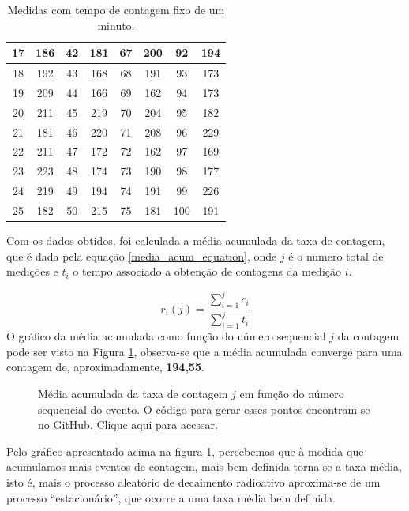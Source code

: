 \documentclass{article}
\begin{document}
\begin{table}[ht]
\begin{tabular}{|c|c|c|c|c|c|c|c|}
17 & 186 & 42 & 181 & 67 & 200 & 92 & 194 \\ \hline
18 & 192 & 43 & 168 & 68 & 191 & 93 & 173 \\ \hline
19 & 209 & 44 & 166 & 69 & 162 & 94 & 173 \\ \hline
20 & 211 & 45 & 219 & 70 & 204 & 95 & 182 \\ \hline
21 & 181 & 46 & 220 & 71 & 208 & 96 & 229 \\ \hline
22 & 211 & 47 & 172 & 72 & 162 & 97 & 169 \\ \hline
23 & 223 & 48 & 174 & 73 & 190 & 98 & 177 \\ \hline
24 & 219 & 49 & 194 & 74 & 191 & 99 & 226 \\ \hline
25 & 182 & 50 & 215 & 75 & 181 & 100 & 191 \\ \hline
    \end{tabular}
\caption{Medidas com tempo de contagem fixo de um minuto.}
    \label{tabela_1}
\end{table}

Com os dados obtidos, foi calculada a média acumulada \cite{fisicaexpV} da taxa de contagem, que é dada pela equação \ref{media_acum_equation}, onde $j$ é o numero total de medições e $t _i$ o tempo associado a obtenção de contagens da medição $i$.

\begin{equation}
\label{media_acum_equation}
r_i (j) = \frac{\sum _{i=1} ^{j} c_i}{\sum _{i=1} ^{j} t_i}
\end{equation}
O gráfico da média acumulada como função do número sequencial $j$ da contagem pode ser visto na Figura \ref{media_acum}, observa-se que a média acumulada converge para uma contagem de, aproximadamente, \textbf{194,55}.

\begin{figure}[H]
    \centering
    \caption{Média acumulada da taxa de contagem $j$ em função do número sequencial do evento. O código para gerar esses pontos encontram-se no GitHub. \href{https://github.com/Vento09/Fisica\_exp\_V}{Clique aqui para acessar.}}
    \label{media_acum}
\end{figure}
Pelo gráfico apresentado acima na figura \ref{media_acum}, percebemos que à medida que acumulamos mais eventos de contagem, mais bem definida torna-se a taxa média, isto é, mais o processo aleatório de decaimento radioativo aproxima-se de um processo “estacionário”, que ocorre a uma taxa média bem definida.
\end{document}
